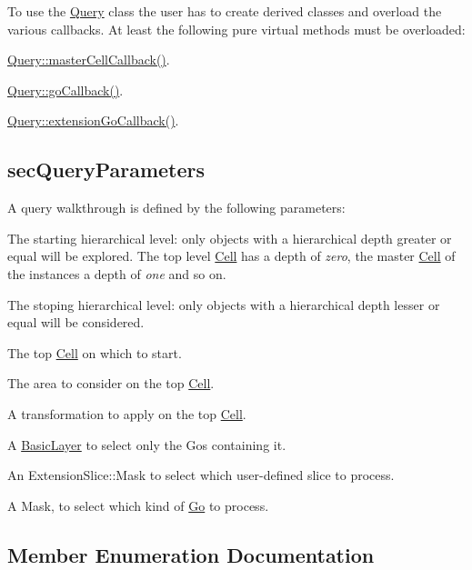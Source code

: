 To use the \hyperlink{classHurricane_1_1Query}{Query} class the user has to create derived classes and overload the various callbacks. At least the following pure virtual methods must be overloaded\+:
\begin{DoxyItemize}
\item \hyperlink{classHurricane_1_1Query_abaf97e93c7fa96469adf64f7865938b4}{Query\+::master\+Cell\+Callback()}.
\item \hyperlink{classHurricane_1_1Query_a59007148bd0afa0405801f341e7e4139}{Query\+::go\+Callback()}.
\item \hyperlink{classHurricane_1_1Query_a75b87e969b64caaf24ec058c0d2dfa68}{Query\+::extension\+Go\+Callback()}.
\end{DoxyItemize}\hypertarget{classHurricane_1_1Query_secQueryParameters}{}\subsection{sec\+Query\+Parameters}\label{classHurricane_1_1Query_secQueryParameters}
A query walkthrough is defined by the following parameters\+:
\begin{DoxyItemize}
\item The starting hierarchical level\+: only objects with a hierarchical depth greater or equal will be explored. The top level \hyperlink{classHurricane_1_1Cell}{Cell} has a depth of {\itshape zero}, the master \hyperlink{classHurricane_1_1Cell}{Cell} of the instances a depth of {\itshape one} and so on.
\item The stoping hierarchical level\+: only objects with a hierarchical depth lesser or equal will be considered.
\item The top \hyperlink{classHurricane_1_1Cell}{Cell} on which to start.
\item The area to consider on the top \hyperlink{classHurricane_1_1Cell}{Cell}.
\item A transformation to apply on the top \hyperlink{classHurricane_1_1Cell}{Cell}.
\item A \hyperlink{classHurricane_1_1BasicLayer}{Basic\+Layer} to select only the Gos containing it.
\item An Extension\+Slice\+::\+Mask to select which user-\/defined slice to process.
\item A Mask, to select which kind of \hyperlink{classHurricane_1_1Go}{Go} to process. 
\end{DoxyItemize}

\subsection{Member Enumeration Documentation}
\mbox{\label{classHurricane_1_1Query_a003517b82eaba58104d1749cf344eaa9}} 
